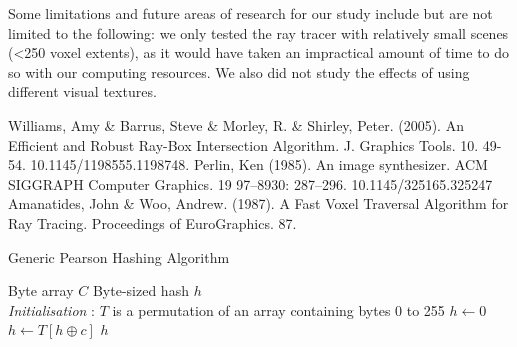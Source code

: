 \documentclass[conference]{IEEEtran}
\begin{document}
Some limitations and future areas of research for our study include but are not limited to the following: we only tested the ray tracer with relatively small scenes (<250 voxel extents), as it would have taken an impractical amount of time to do so with our computing resources. We also did not study the effects of using different visual textures.

\begin{thebibliography}{00}
 Williams, Amy \& Barrus, Steve \& Morley, R. \& Shirley, Peter. (2005). An Efficient and Robust Ray-Box Intersection Algorithm. J. Graphics Tools. 10. 49-54. 10.1145/1198555.1198748.
 Perlin, Ken (1985). An image synthesizer. ACM SIGGRAPH Computer Graphics. 19 97–8930: 287–296. 10.1145/325165.325247
 Amanatides, John \& Woo, Andrew. (1987). A Fast Voxel Traversal Algorithm for Ray Tracing. Proceedings of EuroGraphics. 87.
\end{thebibliography}

\begin{algorithm}[H]
\caption{Generic Pearson Hashing Algorithm}
\begin{algorithmic}[1]
\REQUIRE Byte array $C$
\ENSURE Byte-sized hash $h$
\\ \textit{Initialisation} : $T$ is a permutation of an array containing bytes 0 to 255
\STATE $h \gets 0$
\STATE $h \gets T[h \oplus c]$
\ENDFOR
\RETURN $h$
\end{algorithmic}
\label{pearson}
\end{algorithm}
\end{document}
